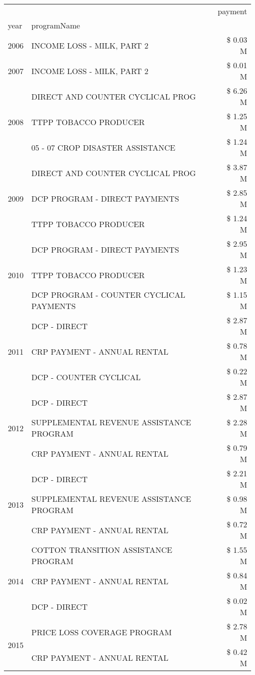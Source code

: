 \begin{tabular}{llr}
\toprule
 &  & payment \\
year & programName &  \\
\midrule
2006 & INCOME LOSS - MILK, PART 2 & \$ 0.03 M \\
\cline{1-3}
2007 & INCOME LOSS - MILK, PART 2 & \$ 0.01 M \\
\cline{1-3}
\multirow[t]{3}{*}{2008} & DIRECT AND COUNTER CYCLICAL PROG & \$ 6.26 M \\
 & TTPP TOBACCO PRODUCER & \$ 1.25 M \\
 & 05 - 07 CROP DISASTER ASSISTANCE & \$ 1.24 M \\
\cline{1-3}
\multirow[t]{3}{*}{2009} & DIRECT AND COUNTER CYCLICAL PROG & \$ 3.87 M \\
 & DCP PROGRAM - DIRECT PAYMENTS & \$ 2.85 M \\
 & TTPP TOBACCO PRODUCER & \$ 1.24 M \\
\cline{1-3}
\multirow[t]{3}{*}{2010} & DCP PROGRAM - DIRECT PAYMENTS & \$ 2.95 M \\
 & TTPP TOBACCO PRODUCER & \$ 1.23 M \\
 & DCP PROGRAM - COUNTER CYCLICAL PAYMENTS & \$ 1.15 M \\
\cline{1-3}
\multirow[t]{3}{*}{2011} & DCP - DIRECT & \$ 2.87 M \\
 & CRP PAYMENT - ANNUAL RENTAL & \$ 0.78 M \\
 & DCP - COUNTER CYCLICAL & \$ 0.22 M \\
\cline{1-3}
\multirow[t]{3}{*}{2012} & DCP - DIRECT & \$ 2.87 M \\
 & SUPPLEMENTAL REVENUE ASSISTANCE PROGRAM & \$ 2.28 M \\
 & CRP PAYMENT - ANNUAL RENTAL & \$ 0.79 M \\
\cline{1-3}
\multirow[t]{3}{*}{2013} & DCP - DIRECT & \$ 2.21 M \\
 & SUPPLEMENTAL REVENUE ASSISTANCE PROGRAM & \$ 0.98 M \\
 & CRP PAYMENT - ANNUAL RENTAL & \$ 0.72 M \\
\cline{1-3}
\multirow[t]{3}{*}{2014} & COTTON TRANSITION ASSISTANCE PROGRAM & \$ 1.55 M \\
 & CRP PAYMENT - ANNUAL RENTAL & \$ 0.84 M \\
 & DCP - DIRECT & \$ 0.02 M \\
\cline{1-3}
\multirow[t]{3}{*}{2015} & PRICE LOSS COVERAGE PROGRAM & \$ 2.78 M \\
 & CRP PAYMENT - ANNUAL RENTAL & \$ 0.42 M \\

\end{tabular}
